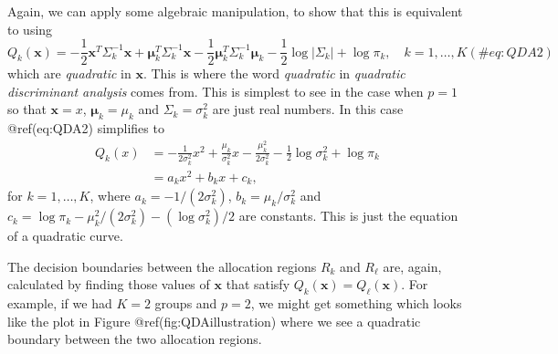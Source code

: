 \documentclass[
]{article}
\begin{document}
Again, we can apply some algebraic manipulation, to show that this is
equivalent to using \begin{equation}
Q_k(\boldsymbol{x}) = - \frac{1}{2} \boldsymbol{x}^T \Sigma_k^{-1} \boldsymbol{x} + \boldsymbol{\mu}_k^T \Sigma_k^{-1} \boldsymbol{x} - \frac{1}{2} \boldsymbol{\mu}_k^T \Sigma_k^{-1} \boldsymbol{\mu}_k - \frac{1}{2} \log |\Sigma_k| + \log \pi_k, \quad k=1,\ldots,K(\#eq:QDA2)
\end{equation} which are \emph{quadratic} in \(\boldsymbol{x}\). This is
where the word \emph{quadratic} in \emph{quadratic discriminant
analysis} comes from. This is simplest to see in the case when \(p=1\)
so that \(\boldsymbol{x}=x\), \(\boldsymbol{\mu}_k = \mu_k\) and
\(\Sigma_k = \sigma_k^2\) are just real numbers. In this case
@ref(eq:QDA2) simplifies to \begin{align*}
Q_k(x) &= - \frac{1}{2 \sigma_k^2} x^2 + \frac{\mu_k}{\sigma_k^2} x - \frac{\mu_k^2}{2 \sigma_k^2} - \frac{1}{2} \log \sigma_k^2 + \log \pi_k\\
       &= a_k x^2 + b_k x + c_k,
\end{align*} for \(k=1,\ldots,K\), where \(a_k = -1 / (2 \sigma_k^2)\),
\(b_k= \mu_k / \sigma_k^2\) and
\(c_k = \log \pi_k - \mu_k^2 / (2 \sigma_k^2) - (\log \sigma_k^2) / 2\)
are constants. This is just the equation of a quadratic curve.

The decision boundaries between the allocation regions \(R_k\) and
\(R_{\ell}\) are, again, calculated by finding those values of
\(\boldsymbol{x}\) that satisfy
\(Q_k(\boldsymbol{x}) = Q_\ell(\boldsymbol{x})\). For example, if we had
\(K=2\) groups and \(p=2\), we might get something which looks like the
plot in Figure @ref(fig:QDAillustration) where we see a quadratic
boundary between the two allocation regions.
\end{document}
